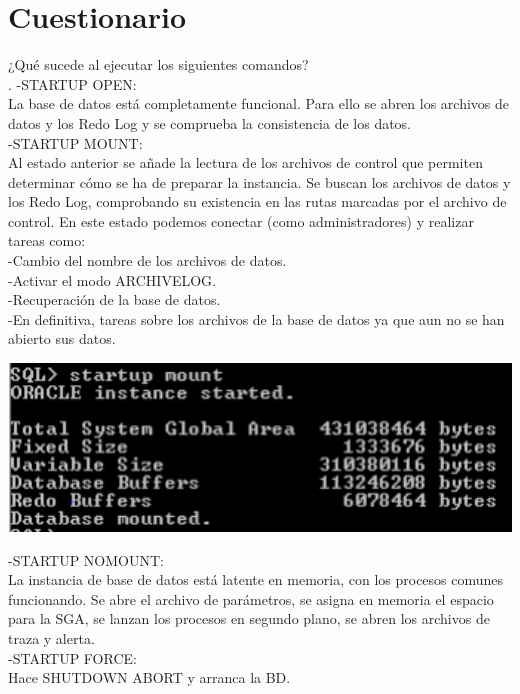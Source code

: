 \section{Cuestionario} 
	\item ¿Qué sucede al ejecutar los siguientes comandos?\\.
	  -STARTUP OPEN:\\
    La base de datos está completamente funcional. Para ello se abren los archivos de datos y los Redo Log y se comprueba la consistencia de los datos.\\
    -STARTUP MOUNT:\\
    Al estado anterior se añade la lectura de los archivos de control que permiten determinar cómo se ha de preparar la instancia. 
    Se buscan los archivos de datos y los Redo Log, comprobando su existencia en las rutas marcadas por el archivo de control.
    En este estado podemos conectar (como administradores) y realizar tareas como:\\
      -Cambio del nombre de los archivos de datos.\\
      -Activar el modo ARCHIVELOG.\\
      -Recuperación de la base de datos.\\
      -En definitiva, tareas sobre los archivos de la base de datos ya que aun no se han abierto sus datos.\\
\begin{center}
	\includegraphics[width=14cm]{./Imagenes/imagen62} 
	\end{center}
  
    -STARTUP NOMOUNT:\\
    La instancia de base de datos está latente en memoria, con los procesos comunes funcionando. 
    Se abre el archivo de parámetros, se asigna en memoria el espacio para la SGA, 
    se lanzan los procesos en segundo plano, se abren los archivos de traza y alerta.\\
    
    -STARTUP FORCE:\\
    Hace SHUTDOWN ABORT y arranca la BD.\\
    
